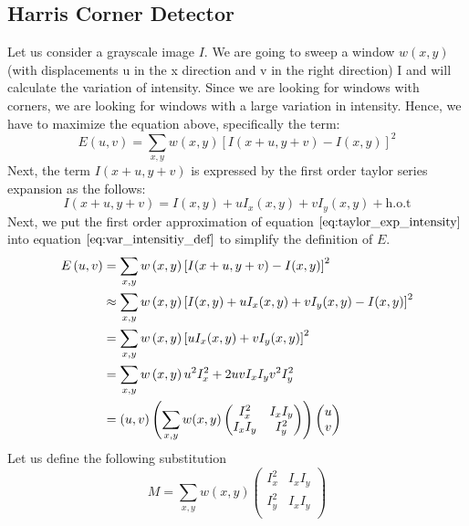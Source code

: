 \subsection{Harris Corner Detector}
\label{sec:harris_corner_detector}
Let us consider a grayscale image $I$. We are going to sweep a window $w(x,y)$ (with displacements u in the x direction and v in the right direction) I and will calculate the variation of intensity. Since we are looking for windows with corners, we are looking for windows with a large variation in intensity. Hence, we have to maximize the equation above, specifically the term:
\begin{equation}
	E \left( u, v \right) = \sum_{x,y} w \left( x,y \right) \left[ I(x + u, y + v) - I(x, y) \right]^2
\label{eq:var_intensitiy_def}
\end{equation}
Next, the term $I(x + u, y + v)$ is expressed by the first order taylor series expansion as the follows:
\begin{equation}
	I(x + u, y + v) = I(x,y) + u I_x (x, y) + v I_y (x,y) + \text{h.o.t}
\label{eq:taylor_exp_intensity}
\end{equation}
Next, we put the first order approximation of equation $\ref{eq:taylor_exp_intensity}$ into equation $\ref{eq:var_intensitiy_def}$ to simplify the definition of $E$.
\begin{equation}
\begin{aligned}
E \left( u, v \right) 
&= \sum_{x,y} w \left( x,y \right) \left[ I(x + u, y + v) - I(x, y) \right]^2 \\
&\approx \sum_{x,y} w \left( x,y \right) \left[ I(x,y) + u I_x (x, y) + v I_y (x,y) - I(x, y) \right]^2 \\
&= \sum_{x,y} w \left( x,y \right) \left[ u I_x (x, y) + v I_y (x,y) \right]^2 \\
&= \sum_{x,y} w \left( x,y \right) u^2 I_x^2 + 2 u v I_x I_y v^2 I_y^2 \\
&= \left( u,v \right) \left( \sum_{x,y} w (x,y)
\begin{pmatrix}
I_x^2 & I_x I_y \\
I_x I_y & I_y^2 \\
\end{pmatrix}
\right) \colvec{u}{v}
\end{aligned}
\label{eq:var_intensitiy_developed}
\end{equation}
Let us define the following substitution
\begin{equation}
M = \sum_{x,y} w  (x,y)
\begin{pmatrix}
I_x^2 & I_x I_y \\
I_y^2 & I_x I_y \\
\end{pmatrix}
\label{eq:var_intensity_sub}
\end{equation}
